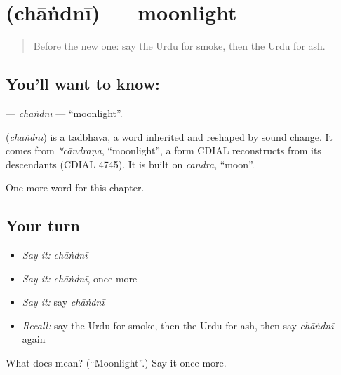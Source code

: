 \section[\texorpdfstring{\ur{چاندنی} (chāṅdnī)}{چاندنی (chāṅdnī)}]{ (chāṅdnī) — moonlight}

\label{lesson:UR-C206-chandni}



\begin{quote}
Before the new one: say the Urdu for smoke, then the Urdu for ash.
\end{quote}

\subsection*{You'll want to know: }
\textbf{} — \emph{chāṅdnī} — \textquotedblleft{}moonlight\textquotedblright{}.

\begin{cousinweb}
\textbf{} (\emph{chāṅdnī}) is a tadbhava, a word inherited and reshaped by sound change. It comes from \emph{*cāndraṇa}, \textquotedblleft{}moonlight\textquotedblright{}, a form CDIAL reconstructs from its descendants (CDIAL 4745). It is built on \emph{candra}, \textquotedblleft{}moon\textquotedblright{}.
\end{cousinweb}

\begin{grammarlens}[title={What you've built}]
One more word for this chapter.
\end{grammarlens}

\subsection*{Your turn}
\begin{itemize}
\raggedright
  \item \emph{Say it:} \emph{chāṅdnī}
  \item \emph{Say it:} \emph{chāṅdnī}, once more
  \item \emph{Say it:} say \emph{chāṅdnī}
  \item \emph{Recall:} say the Urdu for smoke, then the Urdu for ash, then say \emph{chāṅdnī} again
\end{itemize}

\begin{tcolorbox}[breakable,colback=teal!4,colframe=teal!35!black,title={Before you move on}]
What does  mean? (\textquotedblleft{}Moonlight\textquotedblright{}.) Say it once more.
\end{tcolorbox}
